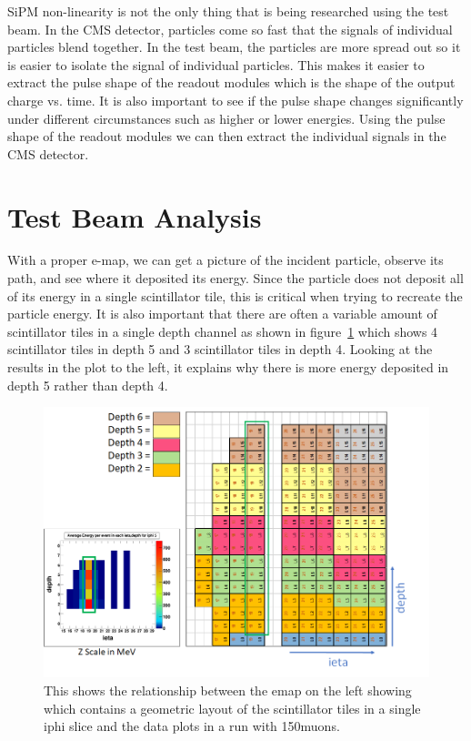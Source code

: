 SiPM non-linearity is not the only thing that is being researched using the test beam. In the CMS detector, particles come so fast that the signals of individual particles blend together. In the test beam, the particles are more spread out so it is easier to isolate the signal of individual particles. This makes it easier to extract the pulse shape of the readout modules which is the shape of the output charge vs. time. It is also important to see if the pulse shape changes significantly under different circumstances such as higher or lower energies. Using the pulse shape of the readout modules we can then extract the individual signals in the CMS detector.

\section{Test Beam Analysis}

With a proper e-map, we can get a picture of the incident particle, observe its path, and see where it deposited its energy. Since the particle does not deposit all of its energy in a single scintillator tile, this is critical when trying to recreate the particle energy. It is also important that there are often a variable amount of scintillator tiles in a single depth channel as shown in figure~\ref{fig:emap} which shows 4 scintillator tiles in depth 5 and 3 scintillator tiles in depth 4. Looking at the results in the plot to the left, it explains why there is more energy deposited in depth 5 rather than depth 4. 

\begin{figure}
\centering
\includegraphics[width=\linewidth]{Figures/eplot.png}
\caption{This shows the relationship between the emap on the left showing which contains a geometric layout of the scintillator tiles in a single iphi slice and the data plots in a run with 150\GeV\space muons.}
\label{fig:emap}
\end{figure}

